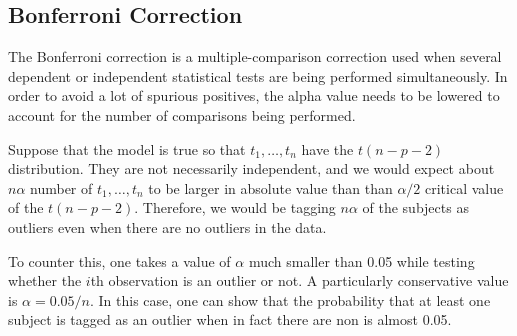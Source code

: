 \subsection{Bonferroni Correction}

The Bonferroni correction is a multiple-comparison correction used when several
dependent or independent statistical tests are being performed simultaneously.
In order to avoid a lot of spurious positives, the alpha value needs to be 
lowered to account for the number of comparisons being performed.

Suppose that the model is true so that $t_{1}, \ldots, t_{n}$ have the $t(n-p-2)$
distribution. They are not necessarily independent, and we would expect about
$n \alpha$ number of $t_{1}, \ldots, t_{n}$ to be larger in absolute value than 
than $\alpha/2$ critical value of the $t(n-p-2)$. Therefore, we would be tagging 
$n \alpha$ of the subjects as outliers even when there are no outliers in the 
data.

To counter this, one takes a value of $\alpha$ much smaller than 0.05 while 
testing whether the $i$th observation is an outlier or not. A particularly conservative 
value is $\alpha = 0.05/n$. In this case, one can show that the probability that at 
least one subject is tagged as an outlier when in fact there are non is almost 0.05. 
